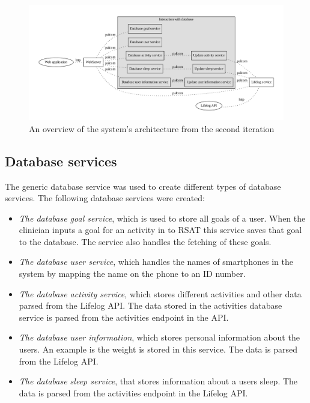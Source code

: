 \documentclass{cslthse-msc}
\begin{document}
\begin{figure}[!hbt]
\centering
\includegraphics[scale=0.4]{forth-version.pdf} 
\caption{An overview of the system's architecture from the second iteration}\label{fig:second-itr}
\end{figure}


\subsection{Database services}

The generic database service was used to create different types of database services. The following database services were created: 

\begin{itemize}
\item \emph{The database goal service}, which is used to store all goals of a user. When the clinician inputs a goal for an activity in to RSAT this service saves that goal to the database. The service also handles the fetching of these goals. 

\item \emph{The database user service}, which handles the names of smartphones in the system by mapping the name on the phone to an ID number. %

\item \emph{The database activity service}, which stores different activities and other data parsed from the Lifelog API. The data stored in the activities database service is parsed from the activities endpoint in the API. 

\item \emph{The database user information}, which stores personal information about the users. An example is the weight is stored in this service. The data is parsed from the Lifelog API.

\item \emph{The database sleep service}, that stores information about a users sleep. The data is parsed from the activities endpoint in the Lifelog API.
\end{itemize}
\end{document}
